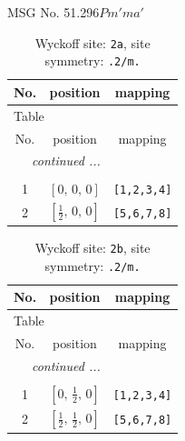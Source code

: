 \documentclass[fleqn,8pt]{jsarticle}
\begin{document}
\setcounter{MaxMatrixCols}{32}

\renewcommand{\tablename}{Table~}
\renewcommand{\figurename}{Figure~}
\begin{center}
\LARGE
MSG No. 51.296\quad$Pm'ma'$
\end{center}
\renewcommand{\arraystretch}{1.2}
\begin{longtable}{ccc}
\caption{Wyckoff site: {\tt 2a}, site symmetry: {\tt .2/m.}}
 \\
 \hline \hline
No. & position & mapping \\ \hline \endfirsthead

\multicolumn{2}{l}{\tablename\ \thetable{}} \\
 \hline \hline
No. & position & mapping \\ \hline \endhead

 \hline \hline
\multicolumn{2}{r}{\footnotesize\it continued ...} \\ \endfoot

 \hline \hline
\multicolumn{2}{r}{} \\ \endlastfoot

1 & $\left[ 0,\, 0,\, 0 \right]$ & {\tt [1,2,3,4]} \\ \hline
2 & $\left[ \frac{1}{2},\, 0,\, 0 \right]$ & {\tt [5,6,7,8]} \\
\end{longtable}
\renewcommand{\arraystretch}{1.2}
\begin{longtable}{ccc}
\caption{Wyckoff site: {\tt 2b}, site symmetry: {\tt .2/m.}}
 \\
 \hline \hline
No. & position & mapping \\ \hline \endfirsthead

\multicolumn{2}{l}{\tablename\ \thetable{}} \\
 \hline \hline
No. & position & mapping \\ \hline \endhead

 \hline \hline
\multicolumn{2}{r}{\footnotesize\it continued ...} \\ \endfoot

 \hline \hline
\multicolumn{2}{r}{} \\ \endlastfoot

1 & $\left[ 0,\, \frac{1}{2},\, 0 \right]$ & {\tt [1,2,3,4]} \\ \hline
2 & $\left[ \frac{1}{2},\, \frac{1}{2},\, 0 \right]$ & {\tt [5,6,7,8]} \\
\end{longtable}
\renewcommand{\arraystretch}{1.2}
\end{document}
